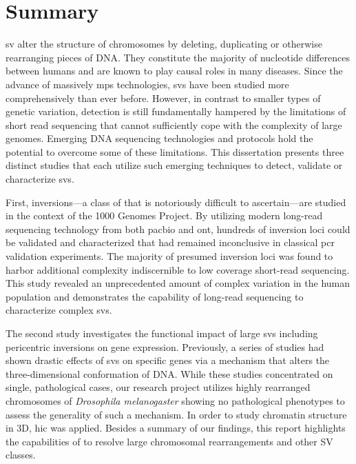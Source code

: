 \cleardoublepage
{}
\chapter*{Summary}

\Acf{sv} alter the structure of chromosomes by deleting, duplicating or
otherwise rearranging pieces of DNA. They constitute the majority of nucleotide
differences between humans and are known to play causal roles in many diseases.
Since the advance of massively \acf{mps} technologies, \acp{sv} have been
studied more comprehensively than ever before. However, in contrast to smaller
types of genetic variation, \sv detection is still fundamentally hampered by
the limitations of short read sequencing that cannot sufficiently cope with the
complexity of large genomes. Emerging DNA sequencing technologies and protocols
hold the potential to overcome some of these limitations. This dissertation
presents three distinct studies that each utilize such emerging techniques to
detect, validate or characterize \acp{sv}.

First, inversions–--a class of \sv that is notoriously difficult to
ascertain---are studied in the context of the 1000 Genomes Project. By utilizing
modern long-read sequencing technology from both \acl{pacbio} and \acl{ont},
hundreds of inversion loci could be validated and characterized that had remained
inconclusive in classical \acs{pcr} validation experiments. The majority of presumed
inversion loci was found to harbor additional complexity indiscernible to low
coverage short-read sequencing. This study revealed an unprecedented amount of
complex variation in the human population and demonstrates the capability of
long-read sequencing to characterize complex \acp{sv}.

The second study investigates the functional impact of large \acp{sv} including
pericentric inversions on gene expression. Previously, a series of studies had
shown drastic effects of \acp{sv} on specific genes via a mechanism that alters
the three-dimensional conformation of DNA. While these studies concentrated on
single, pathological cases, our research project utilizes highly rearranged
chromosomes of \textit{Drosophila melanogaster} showing no pathological
phenotypes to assess the generality of such a mechanism. In order to study
chromatin structure in 3D, \acf{hic} was applied. Besides a summary of our
findings, this report highlights the capabilities of \hic to resolve large
chromosomal rearrangements and other SV classes.

